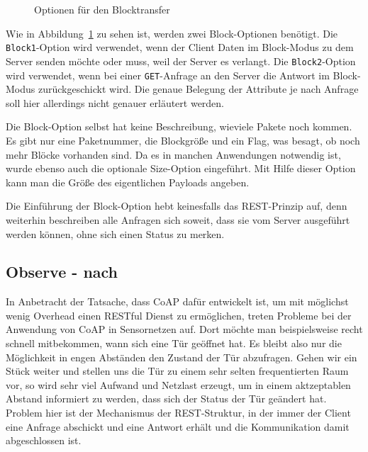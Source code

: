 \begin{figure}[htbp]
    \centering
    \begin{minipage}{.83\textwidth}
    
    \caption{Optionen für den Blocktransfer}
    \end{minipage}
    \label{table:blockoption}
\end{figure}
Wie in Abbildung~\ref{table:blockoption} zu sehen ist, werden zwei Block-Optionen benötigt.
Die \verb!Block1!-Option wird verwendet, wenn der Client Daten im Block-Modus zu dem Server
senden möchte oder muss, weil der Server es verlangt.
Die \verb!Block2!-Option wird verwendet, wenn bei einer \verb!GET!-Anfrage an den Server die
Antwort im Block-Modus zurückgeschickt wird.
Die genaue Belegung der Attribute je nach Anfrage soll hier allerdings nicht
genauer erläutert werden.

Die Block-Option selbst hat keine Beschreibung, wieviele Pakete noch kommen. Es
gibt nur eine Paketnummer, die Blockgröße und ein Flag, was besagt, ob noch mehr
Blöcke vorhanden sind. Da es in manchen Anwendungen notwendig ist, wurde ebenso
auch die optionale Size-Option eingeführt. Mit Hilfe dieser Option kann man die
Größe des eigentlichen Payloads angeben.

Die Einführung der Block-Option hebt keinesfalls das \ac{REST}-Prinzip auf, denn
weiterhin beschreiben alle Anfragen sich soweit, dass sie vom Server ausgeführt
werden können, ohne sich einen Status zu merken.

\subsection{Observe - nach \cite{draft-ietf-core-observe-07}}
In Anbetracht der Tatsache, dass \ac{CoAP} dafür entwickelt ist, um mit möglichst wenig Overhead
einen \ac{REST}ful Dienst zu ermöglichen, treten Probleme bei der Anwendung von \ac{CoAP} in
Sensornetzen auf.
Dort möchte man beispielsweise recht schnell mitbekommen, wann sich eine Tür geöffnet hat.
Es bleibt also nur die Möglichkeit in engen Abständen den Zustand der Tür abzufragen.
Gehen wir ein Stück weiter und stellen uns die Tür zu einem sehr selten frequentierten Raum vor, so
wird sehr viel Aufwand und Netzlast erzeugt, um in einem aktzeptablen Abstand informiert zu werden,
dass sich der Status der Tür geändert hat.
Problem hier ist der Mechanismus der \ac{REST}-Struktur, in der immer der Client eine Anfrage
abschickt und eine Antwort erhält und die Kommunikation damit abgeschlossen ist.
